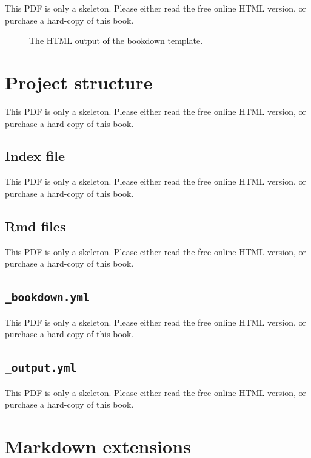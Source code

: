 \documentclass[
  11pt,
]{krantz}
\theoremstyle{definition}
\theoremstyle{definition}
\theoremstyle{definition}
\theoremstyle{definition}
\theoremstyle{remark}
\begin{document}
This PDF is only a skeleton. Please either read the free online HTML version, or purchase a hard-copy of this book.

\begin{figure}\caption{The HTML output of the bookdown template.}\end{figure}

\section{Project structure}\label{bookdown-project}

This PDF is only a skeleton. Please either read the free online HTML version, or purchase a hard-copy of this book.

\subsection{Index file}\label{index-file}

This PDF is only a skeleton. Please either read the free online HTML version, or purchase a hard-copy of this book.

\subsection{Rmd files}\label{rmd-files}

This PDF is only a skeleton. Please either read the free online HTML version, or purchase a hard-copy of this book.

\subsection{\texorpdfstring{\texttt{\_bookdown.yml}}{\_bookdown.yml}}\label{bookdown.yml}

This PDF is only a skeleton. Please either read the free online HTML version, or purchase a hard-copy of this book.

\subsection{\texorpdfstring{\texttt{\_output.yml}}{\_output.yml}}\label{output.yml}

This PDF is only a skeleton. Please either read the free online HTML version, or purchase a hard-copy of this book.

\section{Markdown extensions}\label{bookdown-markdown}
\end{document}
